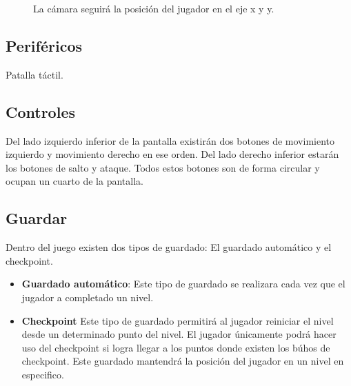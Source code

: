 \documentclass[11pt,letterpaper]{article}
\begin{document}
\begin{figure}
  \centering
  \caption{La cámara seguirá la posición del jugador en el eje x y y.}
  \label{fig:Camara}
\end{figure} 
	\subsection{Periféricos}
	Patalla táctil.
	\subsection{Controles}
	Del lado izquierdo inferior de la pantalla existirán dos botones de movimiento izquierdo y movimiento derecho en ese orden. Del lado derecho inferior estarán los botones de salto y ataque. Todos estos botones son de forma circular y ocupan un cuarto de la pantalla.
	\subsection{Guardar}
Dentro del juego existen dos tipos de guardado: El guardado automático y el checkpoint.
\begin{itemize}
	\item \textbf{Guardado automático}: Este tipo de guardado se realizara cada vez que el jugador a completado un nivel.
	\item \textbf{Checkpoint} Este tipo de guardado permitirá al jugador reiniciar el nivel desde un determinado punto del nivel. El jugador únicamente podrá hacer uso del checkpoint si logra llegar a los puntos donde existen los búhos de checkpoint. Este guardado mantendrá la posición del jugador en un nivel en especifico.
\end{itemize}
\end{document}
